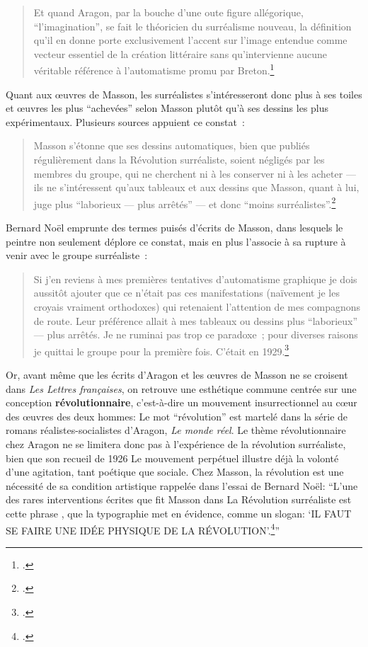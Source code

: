 \begin{quote}
Et quand Aragon, par la bouche d’une oute figure allégorique, \enquote{l’imagination}, se fait le théoricien du surréalisme nouveau, la définition qu’il en donne porte exclusivement l’accent sur l’image entendue comme vecteur essentiel de la création littéraire sans qu’intervienne aucune véritable référence à l’automatisme promu par Breton.\footcite[]{biographie}
\end{quote}

Quant aux \oe{}uvres de Masson, les surréalistes s’intéresseront donc plus à ses toiles et \oe{}uvres les plus \enquote{achevées} selon Masson plutôt qu'à ses dessins les plus expérimentaux. Plusieurs sources appuient ce constat : 

\begin{quote}
Masson s’étonne que ses dessins automatiques, bien que publiés régulièrement dans la Révolution surréaliste, soient négligés par les membres du groupe, qui ne cherchent ni à les conserver ni à les acheter --- ils ne s’intéressent qu’aux tableaux et aux dessins que Masson, quant à lui, juge plus \enquote{laborieux --- plus arrêtés} --- et donc \enquote{moins surréalistes}.\footcite[p. 28]{noel}
\end{quote}
Bernard Noël emprunte des termes puisés d’écrits de Masson, dans lesquels le peintre non seulement déplore ce constat, mais en plus l’associe à sa rupture à venir avec le groupe surréaliste : 
\begin{quote}
Si j’en reviens à mes premières tentatives d’automatisme graphique \textelp{} je dois aussitôt ajouter que ce n’était pas ces manifestations (naïvement je les croyais vraiment orthodoxes) qui retenaient l’attention de mes compagnons de route. Leur préférence allait à mes tableaux ou dessins  plus \enquote{laborieux} –-- plus arrêtés. Je ne ruminai pas trop ce paradoxe ; pour diverses raisons je quittai le groupe pour la première fois. C’était en 1929.\footcite[p. 35]{anneessurrealistes}
\end{quote}
Or, avant même que les écrits d’Aragon et les \oe{}uvres de Masson ne se croisent dans \emph{Les Lettres françaises}, on retrouve une esthétique commune centrée sur une conception \textbf{révolutionnaire}, c’est-à-dire un mouvement insurrectionnel au c\oe{}ur des \oe{}uvres des deux hommes: Le mot \enquote{révolution} est martelé dans la série de romans réalistes-socialistes d’Aragon, \emph{Le monde réel}. Le thème révolutionnaire chez Aragon ne se limitera donc pas à l’expérience de la révolution surréaliste, bien que son recueil de 1926 Le mouvement perpétuel illustre déjà la volonté d’une agitation, tant poétique que sociale. Chez Masson, la révolution est une nécessité de sa condition artistique rappelée dans l’essai de Bernard Noël: \enquote{L’une des rares interventions écrites que fit Masson dans La Révolution surréaliste est cette phrase , que la typographie met en évidence, comme un slogan: \enquote{IL FAUT SE FAIRE UNE IDÉE PHYSIQUE DE LA RÉVOLUTION}.\footcite[p. 28]{noel}}

